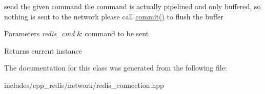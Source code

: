 send the given command the command is actually pipelined and only buffered, so nothing is sent to the network please call \hyperlink{classcpp__redis_1_1network_1_1redis__connection_a8e6980d40139877c16e995051b780d60}{commit()} to flush the buffer


\begin{DoxyParams}{Parameters}
{\em redis\+\_\+cmd} & command to be sent \\
\hline
\end{DoxyParams}
\begin{DoxyReturn}{Returns}
current instance 
\end{DoxyReturn}


The documentation for this class was generated from the following file\+:\begin{DoxyCompactItemize}
\item 
includes/cpp\+\_\+redis/network/redis\+\_\+connection.\+hpp\end{DoxyCompactItemize}
